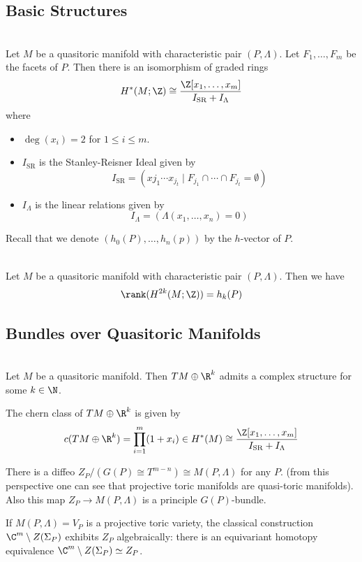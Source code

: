 \documentclass[a4paper]{article}
\begin{document}
\subsection{Basic Structures}
\begin{prp}{}{}\\
Let $M$ be a quasitoric manifold with characteristic pair $(P,\Lambda)$. Let $F_1,\dots,F_m$ be the facets of $P$. Then there is an isomorphism of graded rings $$H^\ast(M;\Z)\cong\frac{\Z[x_1,\dots,x_m]}{I_\text{SR}+I_\Lambda}$$ where 
\begin{itemize}
\item $\deg(x_i)=2$ for $1\leq i\leq m$. 
\item $I_\text{SR}$ is the Stanley-Reisner Ideal given by $$I_\text{SR}=(x{j_1}\cdots x_{j_t}\;|\;F_{j_1}\cap\cdots\cap F_{j_t}=\emptyset)$$
\item $I_\Lambda$ is the linear relations given by $$I_\Lambda=\left(\Lambda(x_1,\dots,x_n)=0\right)$$
\end{itemize}
\end{prp}

Recall that we denote $(h_0(P),\dots,h_n(p))$ by the $h$-vector of $P$. 

\begin{crl}{}{}\\
Let $M$ be a quasitoric manifold with characteristic pair $(P,\Lambda)$. Then we have $$\rank(H^{2k}(M;\Z))=h_k(P)$$
\end{crl}

\subsection{Bundles over Quasitoric Manifolds}
\begin{prp}{}{}\\
Let $M$ be a quasitoric manifold. Then $TM\oplus\R^k$ admits a complex structure for some $k\in\N$. 
\end{prp}

The chern class of $TM\oplus\R^k$ is given by $$c(TM\oplus\R^k)=\prod_{i=1}^m(1+x_i)\in H^\ast(M)\cong\frac{\Z[x_1,\dots,x_m]}{I_\text{SR}+I_\Lambda}$$

There is a diffeo $Z_P/(G(P)\cong T^{m-n})\cong M(P,\Lambda)$ for any $P$. (from this perspective one can see that projective toric manifolds are quasi-toric manifolds). Also this map $Z_P\to M(P,\Lambda)$ is a principle $G(P)$-bundle. 

If $M(P,\Lambda)=V_P$ is a projective toric variety, the classical construction $\C^m\setminus Z(\Sigma_P)$ exhibits $Z_P$ algebraically: there is an equivariant homotopy equivalence $\C^m\setminus Z(\Sigma_P)\simeq Z_P$. 
\end{document}
